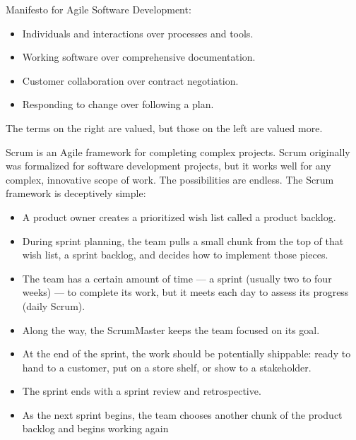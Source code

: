 \documentclass[a4paper]{report}
\begin{document}
Manifesto for Agile Software Development:
\begin{itemize}
\item Individuals and interactions over processes and tools.
\item Working software over comprehensive documentation.
\item Customer collaboration over contract negotiation.
\item Responding to change over following a plan.
\end{itemize}

The terms on the right are valued, but those on the left are valued more.

Scrum is an Agile framework for completing complex projects. Scrum originally was formalized for software development projects, but it works well for any complex, innovative scope of work. The possibilities are endless. The Scrum framework is deceptively simple:

\begin{itemize}
\item A product owner creates a prioritized wish list called a product backlog.
\item During sprint planning, the team pulls a small chunk from the top of that wish list, a sprint backlog, and decides how to implement those pieces.
\item The team has a certain amount of time — a sprint (usually two to four weeks) — to complete its work, but it meets each day to assess its progress (daily Scrum).
\item Along the way, the ScrumMaster keeps the team focused on its goal.
\item At the end of the sprint, the work should be potentially shippable: ready to hand to a customer, put on a store shelf, or show to a stakeholder.
\item The sprint ends with a sprint review and retrospective.
\item As the next sprint begins, the team chooses another chunk of the product backlog and begins working again
\end{itemize}
\end{document}
